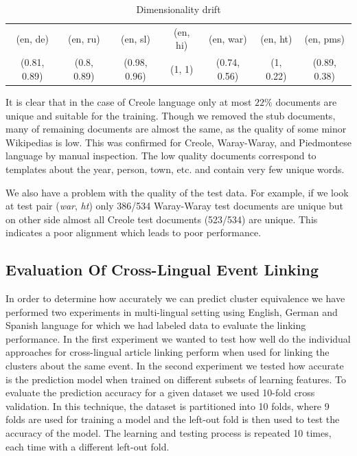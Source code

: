 \documentclass[twoside,11pt]{article}
\begin{document}
\begin{table}[h]
\caption{Dimensionality drift}
\label{table:rank}
\begin{tabular}{|c|c|c|c|c|c|c|}
\cline{1-7}
(en, de)     &   (en, ru)     &   (en, sl)       &     (en, hi)&   (en, war)      &      (en, ht) &   (en, pms)\\
\cline{1-7}
(0.81, 0.89)   &  (0.8, 0.89)  &   (0.98, 0.96)    &    (1, 1)  &   (0.74, 0.56)  &      (1, 0.22)  &   (0.89, 0.38)\\
\cline{1-7}
\end{tabular}
\end{table}

It is clear that in the case of Creole language only at most $22\%$ documents are unique and suitable for the training. Though we removed the stub documents, many of remaining documents are almost the same, as the quality of some minor Wikipedias is low. This was confirmed for Creole, Waray-Waray, and Piedmontese language by manual inspection. The low quality documents correspond to templates about the year, person, town, etc. and contain very few unique words.

We also have a problem with the quality of the test data. For example, if we look at test pair (\emph{war}, \emph{ht}) only 386/534 Waray-Waray test documents are unique but on other side almost all Creole test documents (523/534) are unique. This indicates a poor alignment which leads to poor performance.

\subsection{Evaluation Of Cross-Lingual Event Linking}
In order to determine how accurately we can predict cluster equivalence we have performed two experiments in multi-lingual setting using English, German and Spanish language for which we had labeled data to evaluate the linking performance. In the first experiment we wanted to test how well do the individual approaches for cross-lingual article linking perform when used for linking the clusters about the same event. In the second experiment we tested how accurate is the prediction model when trained on different subsets of learning features. To evaluate the prediction accuracy for a given dataset we used 10-fold cross validation. In this technique, the dataset is partitioned into 10 folds, where 9 folds are used for training a model and the left-out fold is then used to test the accuracy of the model. The learning and testing process is repeated 10 times, each time with a different left-out fold.
\end{document}

